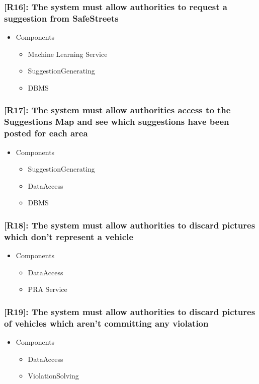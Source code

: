 \documentclass[12pt,a4paper]{article}
\begin{document}
\subsubsection*{[R16]: The system must allow authorities to request a suggestion from SafeStreets}
\begin{itemize}
\item Components
\begin{itemize}
\item Machine Learning Service
\item SuggestionGenerating
\item DBMS
\end{itemize}
\end{itemize}
\subsubsection*{[R17]: The system must allow authorities access to the Suggestions Map and see which suggestions have been posted for each area}
\begin{itemize}
\item Components
\begin{itemize}
\item SuggestionGenerating
\item DataAccess
\item DBMS
\end{itemize}
\end{itemize}
\subsubsection*{[R18]: The system must allow authorities to discard pictures which don't represent a vehicle}
\begin{itemize}
\item Components
\begin{itemize}
\item DataAccess
\item PRA Service
\end{itemize}
\end{itemize}
\subsubsection*{[R19]: The system must allow authorities to discard pictures of vehicles which aren't committing any violation}
\begin{itemize}
\item Components
\begin{itemize}
\item DataAccess
\item ViolationSolving
\end{itemize}
\end{itemize}
\end{document}
